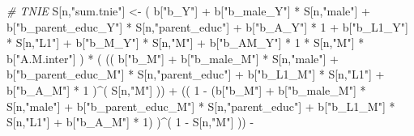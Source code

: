 \documentclass[
]{book}
\newenvironment{Shaded}{\begin{snugshade}}{\end{snugshade}}
\newcommand{\CommentTok}[1]{\textcolor[rgb]{0.56,0.35,0.01}{\textit{#1}}}
\newcommand{\DecValTok}[1]{\textcolor[rgb]{0.00,0.00,0.81}{#1}}
\newcommand{\NormalTok}[1]{#1}
\newcommand{\OtherTok}[1]{\textcolor[rgb]{0.56,0.35,0.01}{#1}}
\newcommand{\SpecialCharTok}[1]{\textcolor[rgb]{0.00,0.00,0.00}{#1}}
\newcommand{\StringTok}[1]{\textcolor[rgb]{0.31,0.60,0.02}{#1}}
\begin{document}
\begin{Shaded}
\begin{Highlighting}[]
    \CommentTok{\# TNIE }
\NormalTok{    S[n,}\StringTok{"sum.tnie"}\NormalTok{] }\OtherTok{\textless{}{-}}\NormalTok{ ( b[}\StringTok{"b\_Y"}\NormalTok{] }\SpecialCharTok{+} 
\NormalTok{                           b[}\StringTok{"b\_male\_Y"}\NormalTok{] }\SpecialCharTok{*}\NormalTok{ S[n,}\StringTok{"male"}\NormalTok{] }\SpecialCharTok{+} 
\NormalTok{                           b[}\StringTok{"b\_parent\_educ\_Y"}\NormalTok{] }\SpecialCharTok{*}\NormalTok{ S[n,}\StringTok{"parent\_educ"}\NormalTok{] }\SpecialCharTok{+} 
\NormalTok{                           b[}\StringTok{"b\_A\_Y"}\NormalTok{] }\SpecialCharTok{*} \DecValTok{1} \SpecialCharTok{+} 
\NormalTok{                           b[}\StringTok{"b\_L1\_Y"}\NormalTok{] }\SpecialCharTok{*}\NormalTok{ S[n,}\StringTok{"L1"}\NormalTok{] }\SpecialCharTok{+}
\NormalTok{                           b[}\StringTok{"b\_M\_Y"}\NormalTok{] }\SpecialCharTok{*}\NormalTok{ S[n,}\StringTok{"M"}\NormalTok{] }\SpecialCharTok{+}
\NormalTok{                           b[}\StringTok{"b\_AM\_Y"}\NormalTok{] }\SpecialCharTok{*} \DecValTok{1} \SpecialCharTok{*}\NormalTok{ S[n,}\StringTok{"M"}\NormalTok{] }\SpecialCharTok{*}\NormalTok{ b[}\StringTok{"A.M.inter"}\NormalTok{] ) }\SpecialCharTok{*}
\NormalTok{      ( (( b[}\StringTok{"b\_M"}\NormalTok{] }\SpecialCharTok{+} 
\NormalTok{             b[}\StringTok{"b\_male\_M"}\NormalTok{] }\SpecialCharTok{*}\NormalTok{ S[n,}\StringTok{"male"}\NormalTok{] }\SpecialCharTok{+} 
\NormalTok{             b[}\StringTok{"b\_parent\_educ\_M"}\NormalTok{] }\SpecialCharTok{*}\NormalTok{ S[n,}\StringTok{"parent\_educ"}\NormalTok{] }\SpecialCharTok{+} 
\NormalTok{             b[}\StringTok{"b\_L1\_M"}\NormalTok{] }\SpecialCharTok{*}\NormalTok{ S[n,}\StringTok{"L1"}\NormalTok{] }\SpecialCharTok{+}
\NormalTok{             b[}\StringTok{"b\_A\_M"}\NormalTok{] }\SpecialCharTok{*} \DecValTok{1}\NormalTok{ )}\SpecialCharTok{\^{}}\NormalTok{( S[n,}\StringTok{"M"}\NormalTok{] )) }\SpecialCharTok{+}
\NormalTok{          (( }\DecValTok{1} \SpecialCharTok{{-}}\NormalTok{ (b[}\StringTok{"b\_M"}\NormalTok{] }\SpecialCharTok{+} 
\NormalTok{                    b[}\StringTok{"b\_male\_M"}\NormalTok{] }\SpecialCharTok{*}\NormalTok{ S[n,}\StringTok{"male"}\NormalTok{] }\SpecialCharTok{+} 
\NormalTok{                    b[}\StringTok{"b\_parent\_educ\_M"}\NormalTok{] }\SpecialCharTok{*}\NormalTok{ S[n,}\StringTok{"parent\_educ"}\NormalTok{] }\SpecialCharTok{+} 
\NormalTok{                    b[}\StringTok{"b\_L1\_M"}\NormalTok{] }\SpecialCharTok{*}\NormalTok{ S[n,}\StringTok{"L1"}\NormalTok{] }\SpecialCharTok{+}
\NormalTok{                    b[}\StringTok{"b\_A\_M"}\NormalTok{] }\SpecialCharTok{*} \DecValTok{1}\NormalTok{) )}\SpecialCharTok{\^{}}\NormalTok{( }\DecValTok{1} \SpecialCharTok{{-}}\NormalTok{ S[n,}\StringTok{"M"}\NormalTok{] )) }\SpecialCharTok{{-}}

\end{Highlighting}
\end{Shaded}
\end{document}
